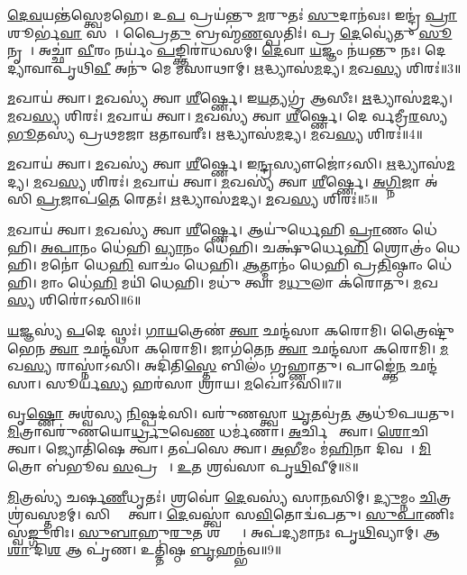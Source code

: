 \ul{𑌦𑍇}\ul{𑌵}𑌯𑌨𑍍𑌤॑𑌸𑍍𑌤𑍍𑌵𑍇𑌮𑌹𑍇। 
𑌉\ul{𑌪} 𑌪𑍍𑌰𑌯॑𑌨𑍍𑌤𑍁 \ul{𑌮}𑌰𑍁𑌤𑌃॑ \ul{𑌸𑍁}𑌦𑌾𑌨॑𑌵𑌃। 
𑌇𑌨𑍍𑌦𑍍𑌰॑ \ul{𑌪𑍍𑌰𑌾}𑌶𑍂𑌰𑍍𑌭॑\ul{𑌵𑌾} 𑌸𑌚𑌾᳚। 
𑌪𑍍𑌰𑍈\ul{𑌤𑍁} 𑌬𑍍𑌰𑌹𑍍𑌮॑\ul{𑌣}𑌸𑍍𑌪𑌤𑌿𑌃॑। 
𑌪𑍍𑌰 \ul{𑌦𑍇}𑌵𑍍𑌯𑍇॑𑌤𑍁 \ul{𑌸𑍂}𑌨𑍃𑌤𑌾᳚। 
𑌅𑌚𑍍𑌛𑌾॑ \ul{𑌵𑍀}𑌰𑌂 𑌨𑌰𑍍𑌯𑌂॑ \ul{𑌪}𑌙𑍍𑌕𑍍𑌤𑌿𑌰𑌾॑𑌧𑌸𑌮𑍍। 
\ul{𑌦𑍇}𑌵𑌾 \ul{𑌯}𑌜𑍍𑌞𑌂 𑌨॑𑌯𑌨𑍍𑌤𑍁 𑌨𑌃। 
𑌦𑍇𑌵𑍀᳚ 𑌦𑍍𑌯𑌾𑌵𑌾𑌪𑍃𑌥𑌿\ul{𑌵𑍀} 𑌅𑌨𑍁॑ 𑌮𑍇 𑌮𑌸𑌾𑌥𑌾𑌮𑍍। 
\ul{𑌋}𑌦𑍍𑌧𑍍𑌯𑌾𑌸॑\ul{𑌮}𑌦𑍍𑌯। 
\ul{𑌮}𑌖\ul{𑌸𑍍𑌯} 𑌶𑌿𑌰𑌃॑॥3॥

\ul{𑌮}𑌖𑌾𑌯॑ 𑌤𑍍𑌵𑌾। 
\ul{𑌮}𑌖𑌸𑍍𑌯॑ 𑌤𑍍𑌵𑌾 \ul{𑌶𑍀}𑌰𑍍𑌷𑍍𑌣𑍇। 
𑌇\ul{𑌯}𑌤𑍍𑌯𑌗𑍍𑌰॑ 𑌆𑌸𑍀𑌃। 
\ul{𑌋}𑌦𑍍𑌧𑍍𑌯𑌾𑌸॑\ul{𑌮}𑌦𑍍𑌯। 
\ul{𑌮}𑌖\ul{𑌸𑍍𑌯} 𑌶𑌿𑌰𑌃॑। 
\ul{𑌮}𑌖𑌾𑌯॑ 𑌤𑍍𑌵𑌾। 
\ul{𑌮}𑌖𑌸𑍍𑌯॑ 𑌤𑍍𑌵𑌾 \ul{𑌶𑍀}𑌰𑍍𑌷𑍍𑌣𑍇। 
𑌦𑍇𑌵𑍀᳚𑌰𑍍𑌵𑌮𑍍𑌰𑍀\ul{𑌰}𑌸𑍍𑌯 \ul{𑌭𑍂}𑌤𑌸𑍍𑌯॑ 𑌪𑍍𑌰𑌥𑌮𑌜𑌾 𑌋𑌤𑌾𑌵𑌰𑍀𑌃। 
\ul{𑌋}𑌦𑍍𑌧𑍍𑌯𑌾𑌸॑\ul{𑌮}𑌦𑍍𑌯। 
\ul{𑌮}𑌖\ul{𑌸𑍍𑌯} 𑌶𑌿𑌰𑌃॑॥4॥

\ul{𑌮}𑌖𑌾𑌯॑ 𑌤𑍍𑌵𑌾। 
\ul{𑌮}𑌖𑌸𑍍𑌯॑ 𑌤𑍍𑌵𑌾 \ul{𑌶𑍀}𑌰𑍍𑌷𑍍𑌣𑍇। 
𑌇\ul{𑌨𑍍𑌦𑍍𑌰}𑌸𑍍𑌯𑍗𑌜𑍋॑𑌽𑌸𑌿। 
\ul{𑌋}𑌦𑍍𑌧𑍍𑌯𑌾𑌸॑\ul{𑌮}𑌦𑍍𑌯। 
\ul{𑌮}𑌖\ul{𑌸𑍍𑌯} 𑌶𑌿𑌰𑌃॑। 
\ul{𑌮}𑌖𑌾𑌯॑ 𑌤𑍍𑌵𑌾। 
\ul{𑌮}𑌖𑌸𑍍𑌯॑ 𑌤𑍍𑌵𑌾 \ul{𑌶𑍀}𑌰𑍍𑌷𑍍𑌣𑍇। 
\ul{𑌅}\ul{𑌗𑍍𑌨𑌿}𑌜𑌾 𑌅॑𑌸𑌿 \ul{𑌪𑍍𑌰}𑌜𑌾𑌪॑\ul{𑌤𑍇} 𑌰𑍇𑌤𑌃॑। 
\ul{𑌋}𑌦𑍍𑌧𑍍𑌯𑌾𑌸॑\ul{𑌮}𑌦𑍍𑌯। 
\ul{𑌮}𑌖\ul{𑌸𑍍𑌯} 𑌶𑌿𑌰𑌃॑॥5॥

\ul{𑌮}𑌖𑌾𑌯॑ 𑌤𑍍𑌵𑌾। 
\ul{𑌮}𑌖𑌸𑍍𑌯॑ 𑌤𑍍𑌵𑌾 \ul{𑌶𑍀}𑌰𑍍𑌷𑍍𑌣𑍇। 
𑌆𑌯𑍁॑𑌰𑍍𑌧𑍇𑌹𑌿 \ul{𑌪𑍍𑌰𑌾}𑌣𑌂 𑌧𑍇॑𑌹𑌿। 
\ul{𑌅}\ul{𑌪𑌾}𑌨𑌂 𑌧𑍇॑𑌹𑌿 \ul{𑌵𑍍𑌯𑌾}𑌨𑌂 𑌧𑍇॑𑌹𑌿। 
𑌚𑌕𑍍𑌷𑍁॑𑌰𑍍𑌧𑍇\ul{𑌹𑌿} 𑌶𑍍𑌰𑍋𑌤𑍍𑌰𑌂॑ 𑌧𑍇𑌹𑌿। 
𑌮𑌨𑍋॑ 𑌧𑍇\ul{𑌹𑌿} 𑌵𑌾𑌚𑌂॑ 𑌧𑍇𑌹𑌿। 
\ul{𑌆}𑌤𑍍𑌮𑌾𑌨𑌂॑ 𑌧𑍇𑌹𑌿 𑌪𑍍𑌰\ul{𑌤𑌿}𑌷𑍍𑌠𑌾𑌂 𑌧𑍇॑𑌹𑌿। 
𑌮𑌾𑌂 𑌧𑍇॑\ul{𑌹𑌿} 𑌮𑌯𑌿॑ 𑌧𑍇𑌹𑌿। 
𑌮𑌧𑍁॑ 𑌤𑍍𑌵𑌾 𑌮\ul{𑌧𑍁}𑌲𑌾 𑌕॑𑌰𑍋𑌤𑍁। 
\ul{𑌮}𑌖\ul{𑌸𑍍𑌯} 𑌶𑌿𑌰𑍋॑𑌽𑌸𑌿॥6॥

\ul{𑌯}𑌜𑍍𑌞𑌸𑍍𑌯॑ \ul{𑌪}𑌦𑍇 𑌸𑍍𑌥𑌃॑। 
\ul{𑌗𑌾}\ul{𑌯}𑌤𑍍𑌰𑍇𑌣॑ \ul{𑌤𑍍𑌵𑌾} 𑌛𑌨𑍍𑌦॑𑌸𑌾 𑌕𑌰𑍋𑌮𑌿। 
𑌤𑍍𑌰𑍈𑌷𑍍𑌟𑍁॑𑌭𑍇𑌨 \ul{𑌤𑍍𑌵𑌾} 𑌛𑌨𑍍𑌦॑𑌸𑌾 𑌕𑌰𑍋𑌮𑌿। 
𑌜𑌾𑌗॑𑌤𑍇𑌨 \ul{𑌤𑍍𑌵𑌾} 𑌛𑌨𑍍𑌦॑𑌸𑌾 𑌕𑌰𑍋𑌮𑌿। 
\ul{𑌮}𑌖\ul{𑌸𑍍𑌯} 𑌰𑌾𑌸𑍍𑌨𑌾॑𑌽𑌸𑌿। 
𑌅𑌦𑌿॑𑌤𑌿\ul{𑌸𑍍𑌤𑍇} 𑌬𑌿𑌲𑌂॑ 𑌗𑍃𑌹𑍍𑌣𑌾𑌤𑍁। 
𑌪𑌾𑌙𑍍𑌕𑍍𑌤𑍇॑\ul{𑌨} 𑌛𑌨𑍍𑌦॑𑌸𑌾। 
𑌸𑍂𑌰𑍍𑌯॑\ul{𑌸𑍍𑌯} 𑌹𑌰॑𑌸𑌾 𑌶𑍍𑌰𑌾𑌯। 
\ul{𑌮}𑌖𑍋॑𑌽𑌸𑌿॥7॥
\anuvakamend[\ul{𑌪}\ul{𑌤𑍇} 𑌶𑌿𑌰॑ 𑌋𑌤𑌾𑌵𑌰𑍀𑌰𑍍\mbox{}\ul{𑌋}𑌦𑍍𑌧𑍍𑌯𑌾𑌸॑\ul{𑌮}𑌦𑍍𑌯 \ul{𑌮}𑌖\ul{𑌸𑍍𑌯} 𑌶𑌿\ul{𑌰𑌃} 𑌶𑌿\ul{𑌰𑌃} 𑌶𑌿𑌰𑍋॑𑌽\ul{𑌸𑌿} 𑌨𑌵॑ 𑌚%
]

𑌵𑍃\ul{𑌷𑍍𑌣𑍋} 𑌅𑌶𑍍𑌵॑𑌸𑍍𑌯 \ul{𑌨𑌿}𑌷𑍍𑌪𑌦॑𑌸𑌿। 
𑌵𑌰𑍁॑𑌣𑌸𑍍𑌤𑍍𑌵𑌾 \ul{𑌧𑍃}𑌤𑌵𑍍𑌰॑\ul{𑌤} 𑌆𑌧𑍂॑𑌪𑌯𑌤𑍁। 
\ul{𑌮𑌿}𑌤𑍍𑌰𑌾𑌵𑌰𑍁॑𑌣𑌯𑍋\ul{𑌰𑍍𑌧𑍍𑌰𑍁}𑌵𑍇\ul{𑌣} 𑌧𑌰𑍍𑌮॑𑌣𑌾। 
\ul{𑌅}𑌰𑍍𑌚𑌿𑌷𑍇᳚ 𑌤𑍍𑌵𑌾। 
\ul{𑌶𑍋}𑌚𑌿𑌷𑍇᳚ 𑌤𑍍𑌵𑌾। 
𑌜𑍍𑌯𑍋𑌤𑌿॑𑌷𑍇 𑌤𑍍𑌵𑌾। 
𑌤𑌪॑𑌸𑍇 𑌤𑍍𑌵𑌾। 
\ul{𑌅}𑌭𑍀𑌮𑌂 𑌮॑\ul{𑌹𑌿}𑌨𑌾 𑌦𑌿𑌵𑌮𑍍᳚। 
\ul{𑌮𑌿}𑌤𑍍𑌰𑍋 𑌬॑𑌭𑍂𑌵 \ul{𑌸}𑌪𑍍𑌰𑌥𑌾𑌃᳚। 
\ul{𑌉}𑌤 𑌶𑍍𑌰𑌵॑𑌸𑌾 𑌪𑍃\ul{𑌥𑌿}𑌵𑍀𑌮𑍍॥8॥

\ul{𑌮𑌿}𑌤𑍍𑌰𑌸𑍍𑌯॑ 𑌚𑌰𑍍\mbox{}𑌷\ul{𑌣𑍀}𑌧𑍃𑌤𑌃॑। 
𑌶𑍍𑌰𑌵𑍋॑ \ul{𑌦𑍇}𑌵𑌸𑍍𑌯॑ 𑌸𑌾\ul{𑌨}𑌸𑌿𑌮𑍍। 
\ul{𑌦𑍍𑌯𑍁}𑌮𑍍𑌨𑌂 \ul{𑌚𑌿}𑌤𑍍𑌰𑌶𑍍𑌰॑𑌵𑌸𑍍𑌤𑌮𑌮𑍍। 
𑌸𑌿𑌧𑍍𑌯𑍈᳚ 𑌤𑍍𑌵𑌾। 
\ul{𑌦𑍇}𑌵𑌸𑍍𑌤𑍍𑌵𑌾॑ 𑌸\ul{𑌵𑌿}𑌤𑍋𑌦𑍍𑌵॑𑌪𑌤𑍁। 
\ul{𑌸𑍁}\ul{𑌪𑌾}𑌣𑌿𑌃 𑌸𑍍𑌵॑\ul{𑌙𑍍𑌗𑍁}𑌰𑌿𑌃। 
\ul{𑌸𑍁}\ul{𑌬𑌾}𑌹𑍁\ul{𑌰𑍁}𑌤 𑌶𑌕𑍍𑌤𑍍𑌯𑌾᳚। 
𑌅𑌪॑𑌦𑍍𑌯𑌮𑌾𑌨𑌃 𑌪𑍃\ul{𑌥𑌿}𑌵𑍍𑌯𑌾𑌮𑍍। 
𑌆\ul{𑌶𑌾} 𑌦𑌿\ul{𑌶} 𑌆 𑌪𑍃॑𑌣। 
𑌉𑌤𑍍𑌤𑌿॑𑌷𑍍𑌠 \ul{𑌬𑍃}𑌹𑌨𑍍𑌭॑𑌵॥9॥

